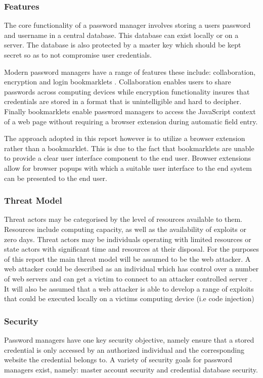 \subsubsection{Features}

The core functionality of a password manager involves storing a users password and username in a central database\cite{sso7}. This database can exist locally or on a server. The database is also protected by a master key which should be kept secret so as to not compromise user credentials.

Modern password managers have a range of features these include: collaboration, encryption and login bookmarklets \cite{sso7}. Collaboration enables users to share passwords across computing devices while encryption functionality insures that credentials are stored in a format that is unintelligible and hard to decipher. Finally bookmarklets enable password managers to access the JavaScript context of a web page without requiring a browser extension during automatic field entry.

The approach adopted in this report however is to utilize a browser extension rather than a bookmarklet. This is due to the fact that bookmarklets are unable to provide a clear user interface component to the end user. Browser extensions allow for browser popups with which a suitable user interface to the end system can be presented to the end user.

\subsubsection{Threat Model}
Threat actors may be categorised by the level of resources available to them. Resources include computing capacity, as well as the availability of exploits or zero days. Threat actors may be individuals operating with limited resources or state actors with significant time and resources at their disposal. For the purposes of this report the main threat model will be assumed to be the web attacker. A web attacker could be described as an individual which has control over a number of web servers and can get a victim to connect to an attacker controlled server \cite{sso7}. It will also be assumed that a web attacker is able to develop a range of exploits that could be executed locally on a victims computing device (i.e code injection)
\subsubsection{Security}
Password managers have one key security objective, namely ensure that a stored credential is only accessed by an authorized individual and the corresponding website the credential belongs to. A variety of security goals for password managers exist\cite{sso7}, namely: master account security and credential database security.

